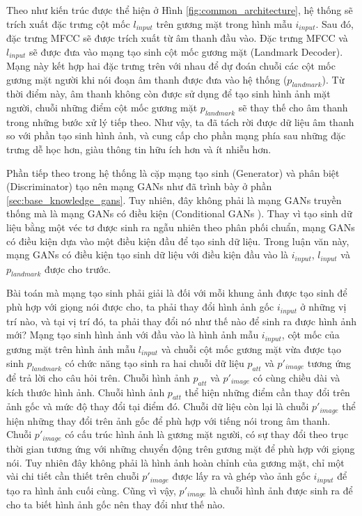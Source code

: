 Theo như kiến trúc được thể hiện ở Hình \ref{fig:common_architecture}, hệ thống sẽ trích xuất đặc trưng cột mốc $l_{input}$ trên gương mặt trong hình mẫu $i_{input}$. Sau đó, đặc trưng MFCC sẽ được trích xuất từ âm thanh đầu vào. Đặc trưng MFCC và $l_{input}$ sẽ được đưa vào mạng tạo sinh cột mốc gương mặt (Landmark Decoder). Mạng này kết hợp hai đặc trưng trên với nhau để dự đoán chuỗi các cột mốc gương mặt người khi nói đoạn âm thanh được đưa vào hệ thống ($p_{landmark}$). Từ thời điểm này, âm thanh không còn được sử dụng để tạo sinh hình ảnh mặt người, chuỗi những điểm cột mốc gương mặt $p_{landmark}$ sẽ thay thế cho âm thanh trong những bước xử lý tiếp theo. Như vậy, ta đã tách rời được dữ liệu âm thanh so với phần tạo sinh hình ảnh, và cung cấp cho phần mạng phía sau những đặc trưng dễ học hơn, giàu thông tin hữu ích hơn và ít nhiễu hơn. 

Phần tiếp theo trong hệ thống là cặp mạng tạo sinh (Generator) và phân biệt (Discriminator) tạo nên mạng GANs như đã trình bày ở phần \ref{sec:base_knowledge_gans}. Tuy nhiên, đây không phải là mạng GANs truyền thống mà là mạng GANs có điều kiện (Conditional GANs \cite{conditional_gan}). Thay vì tạo sinh dữ liệu bằng một véc tơ được sinh ra ngẫu nhiên theo phân phối chuẩn, mạng GANs có điều kiện dựa vào một điều kiện đầu để tạo sinh dữ liệu. Trong luận văn này, mạng GANs có điều kiện tạo sinh dữ liệu với điều kiện đầu vào là $i_{input}$, $l_{input}$ và $p_{landmark}$ được cho trước.

Bài toán mà mạng tạo sinh phải giải là đối với mỗi khung ảnh được tạo sinh để phù hợp với giọng nói được cho, ta phải thay đổi hình ảnh gốc $i_{input}$ ở những vị trí nào, và tại vị trí đó, ta phải thay đổi nó như thế nào để sinh ra được hình ảnh mới? Mạng tạo sinh hình ảnh với đầu vào là hình ảnh mẫu $i_{input}$, cột mốc của gương mặt trên hình ảnh mẫu $l_{input}$ và chuỗi cột mốc gương mặt vừa được tạo sinh $p_{landmark}$ có chức năng tạo sinh ra hai chuỗi dữ liệu $p_{att}$ và $p'_{image}$ tương ứng để trả lời cho câu hỏi trên. Chuỗi hình ảnh $p_{att}$ và $p'_{image}$ có cùng chiều dài và kích thước hình ảnh. Chuỗi hình ảnh $p_{att}$ thể hiện những điểm cần thay đổi trên ảnh gốc và mức độ thay đổi tại điểm đó. Chuỗi dữ liệu còn lại là chuỗi $p'_{image}$ thể hiện những thay đổi trên ảnh gốc để phù hợp với tiếng nói trong âm thanh. Chuỗi $p'_{image}$ có cấu trúc hình ảnh là gương mặt người, có sự thay đổi theo trục thời gian tương ứng với những chuyển động trên gương mặt để phù hợp với giọng nói. Tuy nhiên đây không phải là hình ảnh hoàn chỉnh của gương mặt, chỉ một vài chi tiết cần thiết trên chuỗi $p'_{image}$ được lấy ra và ghép vào ảnh gốc $i_{input}$ để tạo ra hình ảnh cuối cùng. Cũng vì vậy, $p'_{image}$ là chuỗi hình ảnh được sinh ra để cho ta biết hình ảnh gốc nên thay đổi như thế nào. 

